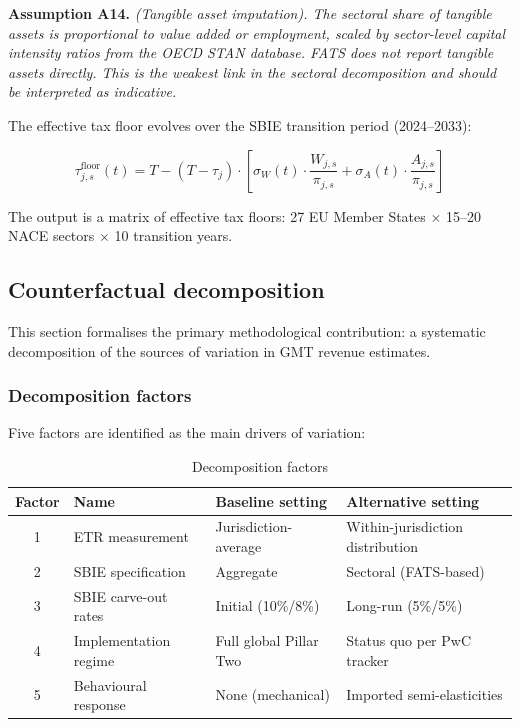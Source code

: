 \documentclass[11pt,a4paper]{article}
\newcommand{\assumption}[2]{\noindent\textbf{Assumption #1.} \textit{#2}\medskip}
\begin{document}
\assumption{A14}{(Tangible asset imputation). The sectoral share of tangible assets is proportional to value added or employment, scaled by sector-level capital intensity ratios from the OECD STAN database. FATS does not report tangible assets directly. This is the weakest link in the sectoral decomposition and should be interpreted as indicative.}

The effective tax floor evolves over the SBIE transition period (2024--2033):

\begin{equation}\label{eq:floor_transition}
\tau_{j,s}^{\text{floor}}(t) = T - (T - \tau_j) \cdot \left[\sigma_W(t) \cdot \frac{W_{j,s}}{\pi_{j,s}} + \sigma_A(t) \cdot \frac{A_{j,s}}{\pi_{j,s}}\right]
\end{equation}

The output is a matrix of effective tax floors: 27 EU Member States $\times$ 15--20 NACE sectors $\times$ 10 transition years.


\subsection{Counterfactual decomposition}\label{sec:decomposition}


This section formalises the primary methodological contribution: a systematic decomposition of the sources of variation in GMT revenue estimates.

\subsubsection{Decomposition factors}\label{sec:factors}

Five factors are identified as the main drivers of variation:

\begin{table}[H]
\centering
\caption{Decomposition factors}
\label{tab:factors}
\small
\begin{tabular}{@{}clp{3.5cm}p{3.5cm}@{}}
\toprule
Factor & Name & Baseline setting & Alternative setting \\
\midrule
1 & ETR measurement & Jurisdiction-average & Within-jurisdiction distribution \\
2 & SBIE specification & Aggregate & Sectoral (FATS-based) \\
3 & SBIE carve-out rates & Initial (10\%/8\%) & Long-run (5\%/5\%) \\
4 & Implementation regime & Full global Pillar Two & Status quo per PwC tracker \\
5 & Behavioural response & None (mechanical) & Imported semi-elasticities \\
\bottomrule
\end{tabular}
\end{table}
\end{document}
